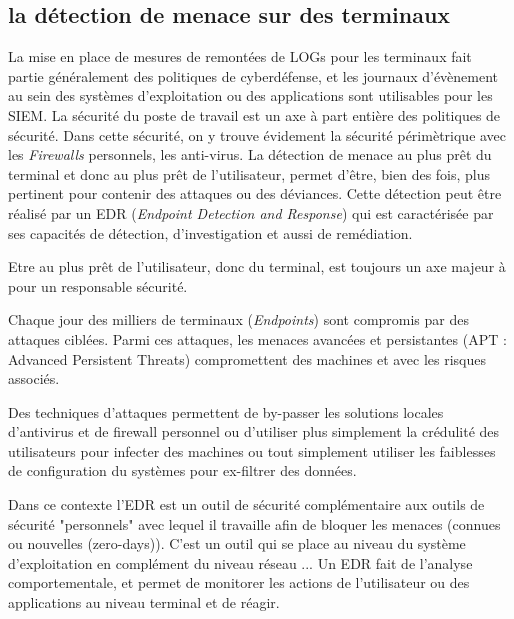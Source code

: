 

\subsection{la détection de menace sur des terminaux}

La mise en place de mesures de remontées de LOGs pour les terminaux fait partie généralement des politiques de cyberdéfense, et les journaux d'évènement au sein des systèmes d'exploitation ou des applications sont utilisables pour les SIEM.
La sécurité du poste de travail est un axe à part entière des politiques de sécurité. Dans cette sécurité, on y trouve évidement la sécurité périmètrique avec les \textit{Firewalls} personnels, les anti-virus. La détection de menace au plus prêt du terminal et donc au plus prêt de l'utilisateur, permet d'être, bien des fois, plus pertinent pour contenir des attaques ou des déviances. Cette détection peut être réalisé par un EDR (\textit{Endpoint Detection and Response}) qui est caractérisée par ses capacités de détection, d’investigation et aussi de remédiation.

Etre au plus prêt de l'utilisateur, donc du terminal, est toujours un axe majeur à pour un responsable sécurité.

Chaque jour des milliers de terminaux (\textit{Endpoints}) sont compromis par des attaques ciblées. Parmi ces attaques, les menaces avancées et persistantes (APT : Advanced Persistent Threats) compromettent des machines et avec les risques associés. 

Des techniques d'attaques permettent de by-passer les solutions locales d'antivirus et de firewall personnel ou d'utiliser plus simplement la crédulité des utilisateurs pour infecter des machines ou tout simplement utiliser les faiblesses de configuration du systèmes pour ex-filtrer des données.

Dans ce contexte l’EDR est un outil de sécurité complémentaire aux outils de sécurité "personnels"  avec lequel il travaille afin de bloquer les menaces (connues ou nouvelles (zero-days)). C’est un outil qui se place au niveau du système d'exploitation en complément du niveau réseau ...  Un EDR fait de l’analyse comportementale, et permet de monitorer les actions de l'utilisateur ou des applications au niveau  terminal et de réagir.

